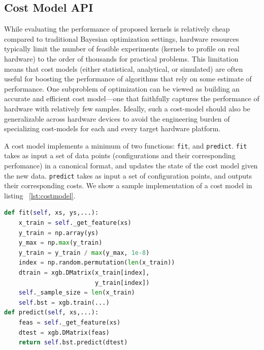 \subsection{Cost Model API}
While evaluating the performance of proposed kernels is relatively cheap compared to traditional Bayesian optimization settings, hardware resources typically limit the number of feasible experiments (kernels to profile on real hardware) to the order of thousands for practical problems.
This limitation means that cost models (either statistical, analytical, or simulated) are often useful for boosting the performance of algorithms that rely on some estimate of performance.
One subproblem of optimization can be viewed as building an accurate and efficient cost model---one that faithfully captures the performance of hardware with relatively few samples.
Ideally, such a cost-model should also be generalizable across hardware devices to avoid the engineering burden of specializing cost-models for each and every target hardware platform.

A cost model implements a minimum of two functions: \texttt{fit}, and \texttt{predict}.
\texttt{fit} takes as input a set of data points (configurations and their corresponding perfomance) in a canonical format, and updates the state of the cost model given the new data.
\texttt{predict} takes as input a set of configuration points, and outputs their corresponding costs.
We show a sample implementation of a cost model in listing ~\autoref{lst:costmodel}.

\begin{lstlisting}[caption={Simplified example of a gradient tree boosting cost model using the XGBoost~\cite{chen2016xgboost} library. \texttt{\_get\_feature} can be any function that presents an arbitrary feature representation to the cost model. For example, this representation may simply be a concatenation of the choices, an AST representation of the lowered code, or a dataflow graph of operations.}, label={lst:costmodel}, language=Python,float,floatplacement=H]
def fit(self, xs, ys,...):
    x_train = self._get_feature(xs)
    y_train = np.array(ys)
    y_max = np.max(y_train)
    y_train = y_train / max(y_max, 1e-8)
    index = np.random.permutation(len(x_train))
    dtrain = xgb.DMatrix(x_train[index],
                         y_train[index])
    self._sample_size = len(x_train)
    self.bst = xgb.train(...)
def predict(self, xs,...):
    feas = self._get_feature(xs)
    dtest = xgb.DMatrix(feas)
    return self.bst.predict(dtest)
\end{lstlisting}


